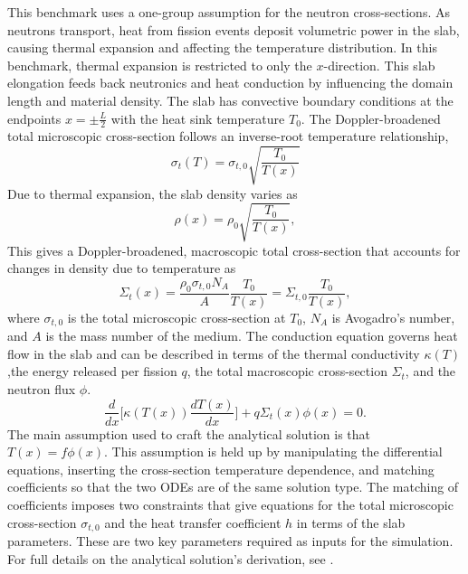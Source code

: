 \documentclass[letterpaper]{mc2023}
\begin{document}
This benchmark uses a one-group assumption for the neutron cross-sections. As neutrons transport, heat from fission events deposit
volumetric power in the slab, causing thermal expansion and affecting the temperature distribution. In this benchmark, thermal
expansion is restricted to only the $x$-direction. This slab elongation feeds back neutronics and heat conduction by influencing
the domain length and material density. The slab has convective boundary conditions at the endpoints $x=\pm \frac{L}{2}$ with the
heat sink temperature $T_{0}$. The Doppler-broadened total microscopic cross-section follows an inverse-root temperature relationship,
\begin{equation}
    \sigma_{t}(T) = \sigma_{t,0}\sqrt{\frac{T_{0}}{T(x)}}
\end{equation}
Due to thermal expansion, the slab density varies as
\begin{equation} \label{sec:intro:density}
    \rho(x) =  \rho_{0} \sqrt{\frac{T_{0}}{T(x)}},
\end{equation}
This gives a Doppler-broadened, macroscopic total cross-section that accounts for changes in density due to temperature as
\begin{equation} \label{sec:intro:doppler}
    \Sigma_{t}(x) = \frac{\rho_{0}\sigma_{t,0} N_{A}}{A} \frac{T_{0}}{T(x)} = \Sigma_{t,0}\frac{T_{0}}{T(x)} ,
\end{equation}
where $ \sigma_{t,0}$ is the total microscopic cross-section at $T_{0}$, $N_{A}$ is Avogadro's number, and $A$ is the mass number
of the medium. The conduction equation governs heat flow in the slab and can be described in terms of the thermal conductivity
$\kappa(T)$,the energy released per fission $q$, the total macroscopic cross-section $\Sigma_{t}$, and the neutron flux $\phi$.
\begin{equation}
     \frac{d}{dx}\bigg[\kappa(T(x))\frac{dT(x)}{dx}\bigg] + q \Sigma_{t}(x)\phi(x) = 0.
\end{equation}
The main assumption used to craft the analytical solution is that $T(x)=f\phi(x)$. This assumption is held up by manipulating
the differential equations, inserting the cross-section temperature dependence, and matching coefficients so that the two ODEs
are of the same solution type. The matching of coefficients imposes two constraints that give equations for the total microscopic
cross-section $\sigma_{t,0}$ and the heat transfer coefficient $h$ in terms of the slab parameters. These are two key parameters
required as inputs for the simulation. For full details on the analytical solution's derivation, see \cite{analytical_benchmark}.
\end{document}
